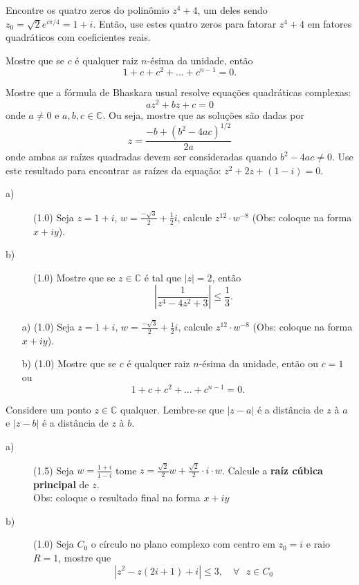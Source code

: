 \problem
 Encontre os quatro zeros do polin\^omio $z^4+4$, um deles sendo $z_0 = \sqrt{2}e^{i\pi/4}=1+i$. Ent\~ao, use estes quatro zeros para fatorar $z^4+4$ em fatores quadr\'aticos com coeficientes reais.


\problem
 Mostre que se $c$ \'e qualquer raiz $n$-\'esima  da unidade, ent\~ao
\[1+c+c^2 +...+c^{n-1} = 0.\]



\problem
 Mostre que a f\'ormula de Bhaskara usual resolve equa\c c\~oes quadr\'aticas complexas:
\[az^2+bz+c=0\]
onde $a\ne0$ e $a,b,c\in \mathbb C$. Ou seja, mostre que as solu\c c\~oes s\~ao dadas por 
\[z=\frac{-b+(b^2-4ac)^{1/2}}{2a}\]
onde ambas as ra\'izes quadradas devem ser consideradas quando $b^2-4ac \ne 0$. Use este resultado para encontrar as ra\'izes da equa\c c\~ao: $z^2+2z+(1-i) = 0$.

\problem 
\begin{description}
\item[a)] (1.0) Seja $z= 1+i$, $w = \frac{-\sqrt{3}}{2}+\frac{1}{2}i$, calcule $z^{12} \cdot w^{-8}$ (Obs: coloque na forma $x+iy$).

\item[b)] (1.0) Mostre que se $z\in \mathbb C$ \'e tal que $|z|=2$, ent\~ao
\[\left|  \frac{1}{z^4-4z^2+3}  \right| \leq \frac{1}{3}.\]
\end{description}


\problem
\begin{itemize}
\item[a)] (1.0) Seja $z= 1+i$, $w = \frac{-\sqrt{3}}{2}+\frac{1}{2}i$, calcule $z^{12}\cdot w^{-8}$ (Obs: coloque na forma $x+iy$).

\item[b)] (1.0) Mostre que se $c$ \'e qualquer raiz $n$-\'esima  da unidade, ent\~ao ou $c=1$ ou
\[1+c+c^2 +...+c^{n-1} = 0.\]
\end{itemize}

\problem
Considere um ponto $z\in \mathbb C$ qualquer. Lembre-se que $|z-a|$ \'e a dist\^ancia de $z$ \`a $a$ e $|z-b|$ \'e a dist\^ancia de $z$ \`a $b$. 

\problem
\begin{description}
\item[a)] (1.5) Seja $w= \frac{1+i}{1-i}$ tome $z=\frac{\sqrt{2}}{2}w + \frac{\sqrt{2}}{2}\cdot i \cdot w$.
Calcule a \textbf{ra\'iz c\'ubica principal} de $z$. \\
{\small Obs: coloque o resultado final na forma $x+iy$}

\item[b)] (1.0) Seja $C_0$ o c\'irculo no plano complexo com centro em $z_0=i$ e raio $R=1$, mostre que 
\[\left| z^2-z(2i+1)+i  \right| \leq 3, \quad \forall \text{ } z\in C_0\]
\end{description}



